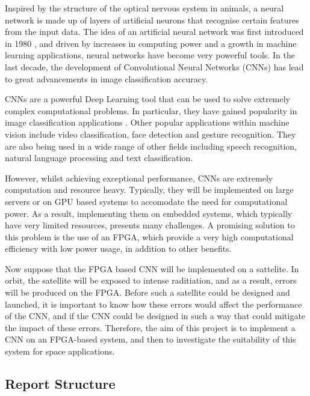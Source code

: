\documentclass[12pt]{article}
\begin{document}
Inspired by the structure of the optical nervous system in animals, a neural network is made up of layers of artificial neurons that recognise certain features from the input data. The idea of an artificial neural network was first introduced in 1980 \cite{neocognitron}, and driven by increases in computing power and a growth in machine learning applications, neural networks have become very powerful tools. In the last decade, the development of Convolutional Neural Networks (CNNs) has lead to great advancements in image classification accuracy.

CNNs are a powerful Deep Learning tool that can be used to solve extremely complex computational problems. In particular, they have gained popularity in image classification applications \cite{ImageNetChallenge}. Other popular applications within machine vision include video classification, face detection and gesture recognition. They are also being used in a wide range of other fields including speech recognition, natural language processing and text classification.

However, whilst achieving exceptional performance, CNNs are extremely computation and resource heavy. Typically, they will be implemented on large servers or on GPU based systems to accomodate the need for computational power. As a result, implementing them on embedded systems, which typically have very limited resources, presents many challenges. A promising solution to this problem is the use of an FPGA, which provide a very high computational efficiency with low power usage, in addition to other benefits.

Now suppose that the FPGA based CNN will be implemented on a sattelite. In orbit, the satellite will be exposed to intense raditiation, and as a result, errors will be produced on the FPGA. Before such a satellite could be designed and launched, it is important to know how these errors would affect the performance of the CNN, and if the CNN could be designed in such a way that could mitigate the impact of these errors. Therefore, the aim of this project is to implement a CNN on an FPGA-based system, and then to investigate the suitability of this system for space applications.

\vspace{-12pt}
\subsection{Report Structure}
\label{sec:Intro-Structure}
\vspace{-12pt}
\end{document}

